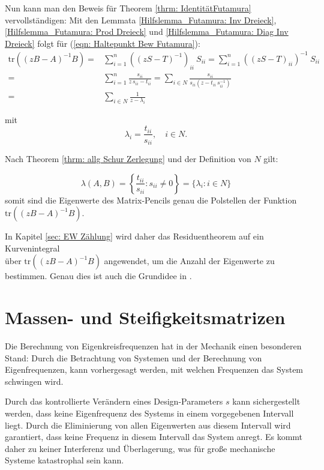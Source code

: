 \documentclass[a4paper,12pt]{report}
\newcommand{\tr}{\text{tr}}
\newcommand{\inv}{^{-1}}
\newcommand{\1}{\mathds{1}}
\theoremstyle{plain} %
\theoremstyle{definition} %
\theoremstyle{remark}
\begin{document}
            Nun kann man den Beweis für Theorem \ref{thrm: IdentitätFutamura} vervollständigen:
            Mit den Lemmata \ref{Hilfslemma_Futamura: Inv Dreieck}, \ref{Hilfslemma_Futamura: Prod Dreieck} und \ref{Hilfslemma_Futamura: Diag Inv Dreieck} folgt für (\ref{eqn: Haltepunkt Bew Futamura}):
            \begin{align*}
                  \tr((zB-A)\inv B) =& \sum_{i=1}^{n}((zS-T)\inv)_{ii}\ S_{ii} = \sum_{i=1}^{n}((zS-T)_{ii})\inv\ S_{ii}\\
                  =& \sum_{i=1}^{n}\frac{s_{ii}}{z\,s_{ii}-t_{ii}} = \sum_{i\in N}\frac{s_{ii}}{s_{ii}(z-t_{ii}\, s_{ii}\inv)}\\
                  =& \sum_{i\in N} \frac{1}{z-\lambda_i}
            \end{align*}

            mit
            $$\lambda_i = \frac{t_{ii}}{s_{ii}},\quad i\in N.$$

            Nach Theorem \ref{thrm: allg Schur Zerlegung} und der Definition von $N$ gilt:

            $$\lambda(A, B) = \left\{\frac{t_{ii}}{s_{ii}} : s_{ii}\ne 0\right\} = \{\lambda_i: i\in N\}$$
            somit sind die Eigenwerte des Matrix-Pencils genau die Polstellen der Funktion $\tr((zB-A)\inv B)$.

            In Kapitel \ref{sec: EW Zählung} wird daher das Residuentheorem auf ein Kurvenintegral\\
            über $\tr((zB-A)\inv B)$ angewendet, um die Anzahl der Eigenwerte zu bestimmen.
            Genau dies ist auch die Grundidee in \cite{grundlageFutamura,hauptteilTkachuk}.
            
\chapter{Massen- und Steifigkeitsmatrizen}
\label{sec: MS Matrizen}
      Die Berechnung von Eigenkreisfrequenzen hat in der Mechanik einen besonderen Stand:
      Durch die Betrachtung von Systemen und der Berechnung von Eigenfrequenzen, kann vorhergesagt werden, mit welchen Frequenzen das System schwingen wird.

      Durch das kontrollierte Verändern eines Design-Parameters $s$ kann sichergestellt werden, dass keine Eigenfrequenz des Systems in einem vorgegebenen Intervall liegt.
      Durch die Eliminierung von allen Eigenwerten aus diesem Intervall wird garantiert, dass keine Frequenz in diesem Intervall das System anregt.
      Es kommt daher zu keiner Interferenz und Überlagerung, was für große mechanische Systeme katastrophal sein kann.
\end{document}
